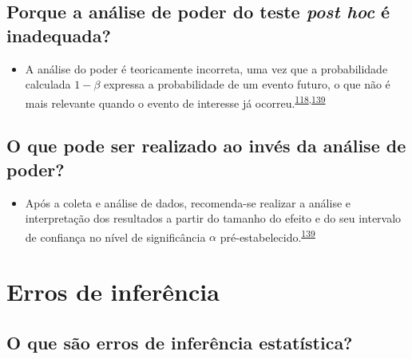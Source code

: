 \documentclass[
]{book}
\providecommand{\tightlist}{%
  \setlength{\itemsep}{0pt}\setlength{\parskip}{0pt}}
\begin{document}
\hypertarget{porque-a-anuxe1lise-de-poder-do-teste-post-hoc-uxe9-inadequada}{%
\subsection{\texorpdfstring{Porque a análise de poder do teste \emph{post hoc} é inadequada?}{Porque a análise de poder do teste post hoc é inadequada?}}\label{porque-a-anuxe1lise-de-poder-do-teste-post-hoc-uxe9-inadequada}}

\begin{itemize}
\tightlist
\item
  A análise do poder é teoricamente incorreta, uma vez que a probabilidade calculada \(1-\beta\) expressa a probabilidade de um evento futuro, o que não é mais relevante quando o evento de interesse já ocorreu.\textsuperscript{\protect\hyperlink{ref-Cummings2003}{118},\protect\hyperlink{ref-heckman2022}{139}}
\end{itemize}

\hypertarget{o-que-pode-ser-realizado-ao-invuxe9s-da-anuxe1lise-de-poder}{%
\subsection{O que pode ser realizado ao invés da análise de poder?}\label{o-que-pode-ser-realizado-ao-invuxe9s-da-anuxe1lise-de-poder}}

\begin{itemize}
\tightlist
\item
  Após a coleta e análise de dados, recomenda-se realizar a análise e interpretação dos resultados a partir do tamanho do efeito e do seu intervalo de confiança no nível de significância \(\alpha\) pré-estabelecido.\textsuperscript{\protect\hyperlink{ref-heckman2022}{139}}
\end{itemize}

\hypertarget{erros-de-inferuxeancia}{%
\section{Erros de inferência}\label{erros-de-inferuxeancia}}

\hypertarget{o-que-suxe3o-erros-de-inferuxeancia-estatuxedstica}{%
\subsection{O que são erros de inferência estatística?}\label{o-que-suxe3o-erros-de-inferuxeancia-estatuxedstica}}
\end{document}
